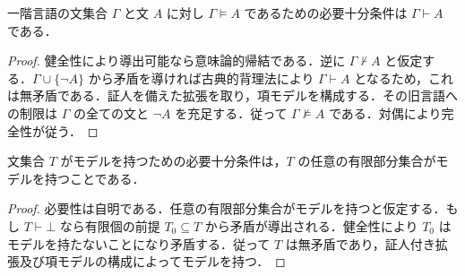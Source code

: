 \begin{prop}[Gödelの完全性定理]
一階言語の文集合 $\Gamma$ と文 $A$ に対し $\Gamma\models A$ であるための必要十分条件は $\Gamma\vdash A$ である．
\end{prop}
\begin{proof}
健全性により導出可能なら意味論的帰結である．逆に $\Gamma\not\vdash A$ と仮定する．$\Gamma\cup\{\neg A\}$ から矛盾を導ければ古典的背理法により $\Gamma\vdash A$ となるため，これは無矛盾である．証人を備えた拡張を取り，項モデルを構成する．その旧言語への制限は $\Gamma$ の全ての文と $\neg A$ を充足する．従って $\Gamma\not\models A$ である．対偶により完全性が従う．
\end{proof}
\begin{prop}[一階論理のコンパクト性]
文集合 $T$ がモデルを持つための必要十分条件は，$T$ の任意の有限部分集合がモデルを持つことである．
\end{prop}
\begin{proof}
必要性は自明である．任意の有限部分集合がモデルを持つと仮定する．もし $T\vdash\bot$ なら有限個の前提 $T_0\subseteq T$ から矛盾が導出される．健全性により $T_0$ はモデルを持たないことになり矛盾する．従って $T$ は無矛盾であり，証人付き拡張及び項モデルの構成によってモデルを持つ．
\end{proof}
